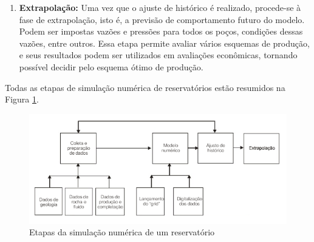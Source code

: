 \begin{enumerate}
\item \textbf{Extrapola\c{c}\~{a}o:} Uma vez que o ajuste de hist\'{o}rico \'{e} realizado, procede-se \`{a} fase de extrapola\c{c}\~{a}o, isto \'{e}, a previs\~{a}o de comportamento futuro do modelo. Podem ser impostas vaz\~{o}es e press\~{o}es para todos os po\c{c}os, condi\c{c}\~{o}es dessas vaz\~{o}es, entre outros. Essa etapa permite avaliar v\'{a}rios esquemas de produ\c{c}\~{a}o, e seus resultados podem ser utilizados em avalia\c{c}\~{o}es econ\^{o}micas, tornando poss\'{i}vel decidir pelo esquema \'{o}timo de produ\c{c}\~{a}o.
\end{enumerate}

Todas as etapas de simula\c{c}\~{a}o num\'{e}rica de reservat\'{o}rios est\~{a}o resumidos na Figura \ref{fig:revisao_simsec2}.

\begin{figure}[!ht]
	\centering
	\includegraphics[width=.75\textwidth]{figs/revisao/revisao_simsec2}
	\caption{Etapas da simula\c{c}\~{a}o num\'{e}rica de um reservat\'{o}rio \cite[p. 523]{engres}}
	\label{fig:revisao_simsec2}
\end{figure}
